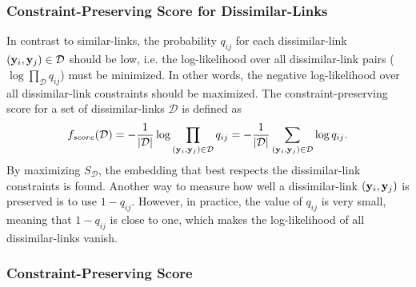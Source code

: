 \subsubsection*{Constraint-Preserving Score for Dissimilar-Links}
In contrast to similar-links, the probability $q_{ij}$ for each dissimilar-link $({\bf y}_i, {\bf y}_j) \in \mathcal{D}$ should be low, i.e. the log-likelihood over all dissimilar-link pairs ($\log \prod_{\mathcal{D}} q_{ij}$) must be minimized. In other words, the negative log-likelihood over all dissimilar-link constraints should be maximized. The constraint-preserving score for a set of dissimilar-links $\mathcal{D}$ is defined as
\begin{equation}
f_{score}(\mathcal{D}) = -\frac{1}{|\mathcal{D}|} \log \prod_{({\bf y}_i, {\bf y}_j) \in \mathcal{D}} q_{ij}
                = -\frac{1}{|\mathcal{D}|} \sum_{({\bf y}_i, {\bf y}_j) \in \mathcal{D}} \log q_{ij}.
\end{equation}
By maximizing $S_{\mathcal{D}}$, the embedding that best respects the dissimilar-link constraints is found.
Another way to measure how well a dissimilar-link $({\bf y}_i, {\bf y}_j)$ is preserved is to use $1 - q_{ij}$. However, in practice, the value of $q_{ij}$ is very small, meaning that $1 - q_{ij}$ is close to one, which makes the log-likelihood of all dissimilar-links vanish.

\subsubsection*{Constraint-Preserving Score}


